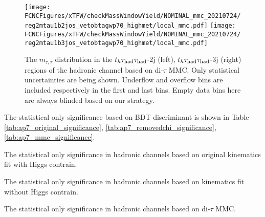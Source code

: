 \begin{figure}[H]
\centering
\texttt{[image: \\FCNCFigures/xTFW/checkMassWindowYield/NOMINAL\_mmc\_20210724/reg2mtau1b2jos\_vetobtagwp70\_highmet/local\_mmc.pdf]}
\texttt{[image: \\FCNCFigures/xTFW/checkMassWindowYield/NOMINAL\_mmc\_20210724/reg2mtau1b3jos\_vetobtagwp70\_highmet/local\_mmc.pdf]}
\caption{The $m_{\tau,\tau}$ distribution in the $t_h\tau_\text{had}{}\tau_\text{had}$-2j (left), $t_h\tau_\text{had}{}\tau_\text{had}$-3j (right) regions of the hadronic channel based on di-$\tau$ MMC. Only statistical uncertainties are being shown. Underflow and overflow bins are included respectively in the first and last bins. Empty data bins here are always blinded based on our strategy.}
\label{fig:ap7_ttmass_mmc}
\end{figure}


The statistical only significance based on BDT discriminant is shown in Table \ref{tab:ap7_original_significance}, \ref{tab:ap7_removedchi_significance},\ref{tab:ap7_mmc_significance}.

\begin{table}[H]
\caption{The statistical only significance in hadronic channels based on original kinematics fit with Higgs contrain.}
\label{tab:ap7_original_significance}

\end{table}

\begin{table}[H]
\caption{The statistical only significance in hadronic channels based on kinematics fit without Higgs contrain.}
\label{tab:ap7_removedchi_significance}

\end{table}

\begin{table}[H]
\caption{The statistical only significance in hadronic channels based on di-$\tau$ MMC.}
\label{tab:ap7_mmc_significance}

\end{table}

